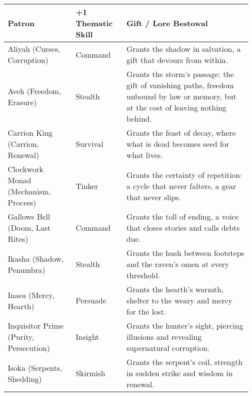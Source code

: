 \newcommand{\PatronGift}[2]{%
\paragraph{Patron's Gift (Imbuement).}
\textbf{Cost: Free, requires a Thaisos}

Once per scene as an action (cost: 1 Boon; requires \textbf{Thiasos}), touch an item to imbue it until scene end with \textbf{+1 Melee} and \textbf{+1 #1}. \emph{Push It:} extend one more scene by marking \textbf{+1 Obligation}. Gifts from the same Patron don’t stack; take the best. Dice bonuses respect the +3 cap. \textit{Domain:} #2.
}
\begin{table}[H]
  \centering
  \renewcommand{\arraystretch}{1.15}
  \begin{tabular}{@{}p{3.8cm}p{3.8cm}p{7.5cm}@{}}
  \toprule
  \textbf{Patron} & \textbf{+1 Thematic Skill} & \textbf{Gift / Lore Bestowal} \\
  \midrule
  Aliyah (Curses, Corruption) & Command & Grants the shadow in salvation, a gift that devours from within. \\
  Aveh (Freedom, Erasure) & Stealth & Grants the storm’s passage: the gift of vanishing paths, freedom unbound by law or memory, but at the cost of leaving nothing behind. \\
  Carrion King (Carrion, Renewal) & Survival & Grants the feast of decay, where what is dead becomes seed for what lives. \\
  Clockwork Monad (Mechanism, Process) & Tinker & Grants the certainty of repetition: a cycle that never falters, a gear that never slips. \\
  Gallows Bell (Doom, Last Rites) & Command & Grants the toll of ending, a voice that closes stories and calls debts due. \\
  Ikasha (Shadow, Penumbra) & Stealth & Grants the hush between footsteps and the raven's omen at every threshold. \\
  Inaea (Mercy, Hearth) & Persuade & Grants the hearth's warmth, shelter to the weary and mercy for the lost. \\
  Inquisitor Prime (Purity, Persecution) & Insight & Grants the hunter's sight, piercing illusions and revealing supernatural corruption. \\
  Isoka (Serpents, Shedding) & Skirmish & Grants the serpent's coil, strength in sudden strike and wisdom in renewal. \\

\end{tabular}
\end{table}

